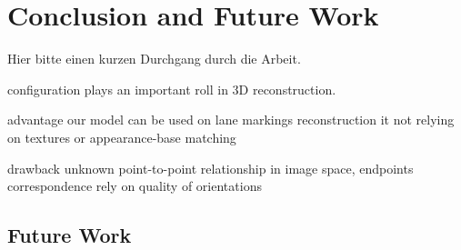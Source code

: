 
\chapter{Conclusion and Future Work}
\label{chap:conclusion}
Hier bitte einen kurzen Durchgang durch die Arbeit.

configuration plays an important roll in 3D reconstruction.


advantage
our model can be used on lane markings reconstruction
it 
not relying on textures or appearance-base matching


drawback
unknown point-to-point relationship in image space, endpoints correspondence rely on quality of orientations

\section*{Future Work}
\label{chap:futurework}




